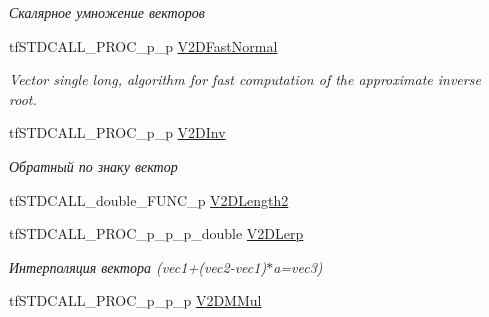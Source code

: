 \begin{DoxyCompactItemize}
\begin{DoxyCompactList}\small\item\em Скалярное умножение векторов \end{DoxyCompactList}\item 
\hypertarget{structs_functions_vector_c_p_u_a433bed0aeb24e2ed304fc6b4d65e5f04}{tf\-S\-T\-D\-C\-A\-L\-L\-\_\-\-P\-R\-O\-C\-\_\-p\-\_\-p \hyperlink{structs_functions_vector_c_p_u_a433bed0aeb24e2ed304fc6b4d65e5f04}{V2\-D\-Fast\-Normal}}\label{structs_functions_vector_c_p_u_a433bed0aeb24e2ed304fc6b4d65e5f04}

\begin{DoxyCompactList}\small\item\em Vector single long, algorithm for fast computation of the approximate inverse root. \end{DoxyCompactList}\item 
\hypertarget{structs_functions_vector_c_p_u_acb2cd905e331868a39b64893a6d3ff8e}{tf\-S\-T\-D\-C\-A\-L\-L\-\_\-\-P\-R\-O\-C\-\_\-p\-\_\-p \hyperlink{structs_functions_vector_c_p_u_acb2cd905e331868a39b64893a6d3ff8e}{V2\-D\-Inv}}\label{structs_functions_vector_c_p_u_acb2cd905e331868a39b64893a6d3ff8e}

\begin{DoxyCompactList}\small\item\em Обратный по знаку вектор \end{DoxyCompactList}\item 
tf\-S\-T\-D\-C\-A\-L\-L\-\_\-double\-\_\-\-F\-U\-N\-C\-\_\-p \hyperlink{structs_functions_vector_c_p_u_a254fa3a658022f481d20a473c669becb}{V2\-D\-Length2}
\item 
\hypertarget{structs_functions_vector_c_p_u_ac741248d7c987fc017da48c90194a2dd}{tf\-S\-T\-D\-C\-A\-L\-L\-\_\-\-P\-R\-O\-C\-\_\-p\-\_\-p\-\_\-p\-\_\-double \hyperlink{structs_functions_vector_c_p_u_ac741248d7c987fc017da48c90194a2dd}{V2\-D\-Lerp}}\label{structs_functions_vector_c_p_u_ac741248d7c987fc017da48c90194a2dd}

\begin{DoxyCompactList}\small\item\em Интерполяция вектора (vec1+(vec2-\/vec1)$\ast$a=vec3) \end{DoxyCompactList}\item 
\hypertarget{structs_functions_vector_c_p_u_ae3a986a3e99245eed765fe73adb44a15}{tf\-S\-T\-D\-C\-A\-L\-L\-\_\-\-P\-R\-O\-C\-\_\-p\-\_\-p\-\_\-p \hyperlink{structs_functions_vector_c_p_u_ae3a986a3e99245eed765fe73adb44a15}{V2\-D\-M\-Mul}}\label{structs_functions_vector_c_p_u_ae3a986a3e99245eed765fe73adb44a15}


\end{DoxyCompactItemize}
